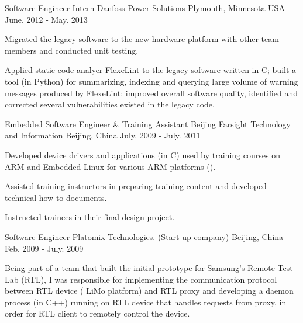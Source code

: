 

\begin{cventries}

  \cventry
    {Software Engineer Intern} %
    {Danfoss Power Solutions} %
    {Plymouth, Minnesota USA} %
    {June. 2012 - May. 2013} %
    {
      \begin{cvitems} %
        \item {Migrated the legacy software to the new hardware
    platform with other team members and conducted unit testing.}
       \item {Applied static code analyer FlexeLint to
    the legacy software written in C; built a tool (in Python) for
    summarizing, indexing and querying large volume of warning
    messages produced by FlexeLint; improved overall software quality, identified
    and corrected several vulnerabilities existed in the legacy code.}
      \end{cvitems}
    }

  \cventry
    {Embedded Software Engineer \& Training Assistant} %
    {Beijing Farsight Technology and Information} %
    {Beijing, China} %
    {July. 2009 - July. 2011} %
    {
      \begin{cvitems} %
        \item {Developed device drivers and applications (in C) used by
    training courses on ARM and Embedded Linux for various ARM
    platforms ().}
        \item {Assisted training instructors in preparing training
    content and developed technical how-to documents.}
        \item {Instructed trainees in their final design project.}
      \end{cvitems}
    }

  \cventry
    {Software Engineer} %
    {Platomix Technologies. (Start-up company)} %
    {Beijing, China} %
    {Feb. 2009 - July. 2009} %
    {
      \begin{cvitems} %
        \item {Being part of a team that built the initial prototype for
    Samsung's Remote Test Lab (RTL), I was responsible for implementing
    the communication protocol between RTL device (
    LiMo platform) and RTL proxy and developing a daemon process (in
    C++) running on RTL device that handles requests from proxy, in order for RTL client to
    remotely control the device.} 
      \end{cvitems}
    }

\end{cventries}
